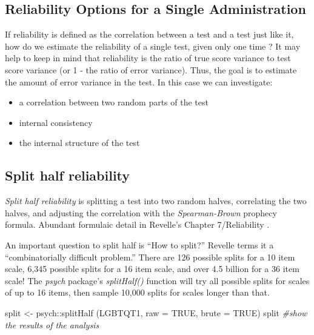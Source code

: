\documentclass[
  english,
]{book}
\newenvironment{Shaded}{\begin{snugshade}}{\end{snugshade}}
\newcommand{\AttributeTok}[1]{\textcolor[rgb]{0.77,0.63,0.00}{#1}}
\newcommand{\CommentTok}[1]{\textcolor[rgb]{0.56,0.35,0.01}{\textit{#1}}}
\newcommand{\ConstantTok}[1]{\textcolor[rgb]{0.00,0.00,0.00}{#1}}
\newcommand{\FunctionTok}[1]{\textcolor[rgb]{0.00,0.00,0.00}{#1}}
\newcommand{\NormalTok}[1]{#1}
\newcommand{\OtherTok}[1]{\textcolor[rgb]{0.56,0.35,0.01}{#1}}
\newcommand{\SpecialCharTok}[1]{\textcolor[rgb]{0.00,0.00,0.00}{#1}}
\providecommand{\tightlist}{%
  \setlength{\itemsep}{0pt}\setlength{\parskip}{0pt}}
\begin{document}
\hypertarget{reliability-options-for-a-single-administration}{%
\subsection{Reliability Options for a Single Administration}\label{reliability-options-for-a-single-administration}}

If reliability is defined as the correlation between a test and a test just like it, how do we estimate the reliability of a single test, given only one time \citep{revelle_william_reliability_nodate}? It may help to keep in mind that reliability is the ratio of true score variance to test score variance (or 1 - the ratio of error variance). Thus, the goal is to estimate the amount of error variance in the test. In this case we can investigate:

\begin{itemize}
\tightlist
\item
  a correlation between two random parts of the test
\item
  internal consistency
\item
  the internal structure of the test
\end{itemize}

\hypertarget{split-half-reliability}{%
\subsection{Split half reliability}\label{split-half-reliability}}

\emph{Split half reliability} is splitting a test into two random halves, correlating the two halves, and adjusting the correlation with the \emph{Spearman-Brown} prophecy formula. Abundant formulaic detail in Revelle's Chapter 7/Reliability \citeyearpar{revelle_william_personality_nodate}.

An important question to split half is ``How to split?'' Revelle terms it a ``combinatorially difficult problem.'' There are 126 possible splits for a 10 item scale, 6,345 possible splits for a 16 item scale, and over 4.5 billion for a 36 item scale! The \emph{psych} package's \emph{splitHalf()} function will try all possible splits for scales of up to 16 items, then sample 10,000 splits for scales longer than that.

\begin{Shaded}
\begin{Highlighting}[]
\NormalTok{split }\OtherTok{\textless{}{-}}\NormalTok{ psych}\SpecialCharTok{::}\FunctionTok{splitHalf}\NormalTok{ (LGBTQT1, }\AttributeTok{raw =} \ConstantTok{TRUE}\NormalTok{, }\AttributeTok{brute =} \ConstantTok{TRUE}\NormalTok{)}
\NormalTok{split }\CommentTok{\#show the results of the analysis}
\end{Highlighting}
\end{Shaded}
\end{document}
